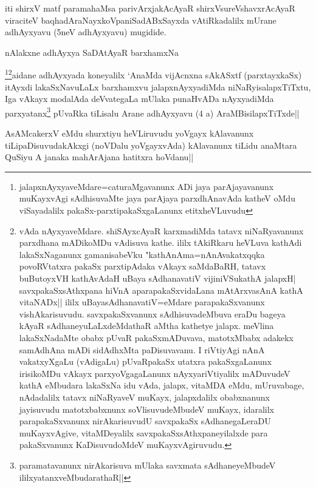 \begin{center}
iti shirxV matf paramahaMsa parivArxjakAcAyaR shirxVsureVshavxrAcAyaR viraciteV baqhadAraNayxkoVpaniSadABxSayxda vAtiRkadalilx mUrane adhAyxyavu (5neV adhAyxyavu) mugidide.
\end{center}
\stext 

\begin{center}%
nAlakxne adhAyxya SaDAtAyaR barxhamxNa
\end{center}

\begin{artha}
\footnote[1]{jalapxnAyxyaveMdare=caturaMgavanunx ADi jaya parAjayavanunx muKayxvAgi sAdhisuvaMte jaya parAjaya parxdhAnavAda katheV oMdu viSayadalilx pakaSx-parxtipakaSxgaLanunx etitxheVLuvudu}\footnote[2]{vAda nAyxyaveMdare. shiSAyxcAyaR karxmadiMda tatavx niNaRyavanunx parxdhana mADikoMDu vAdisuva kathe. ililx tAkiRkaru heVLuva kathAdi lakaSxNaganunx gamanisabeVku "kathAnAma=nAnAvakatxqqka povoRVtatxra pakaSx parxtipAdaka vAkayx saMdaBaRH, tatavx buButoyxVH kathAvAdaH uBaya sAdhanavatiV vijiniVSukathA jalapxH| savxpakaSxsAthxpana hiVnA aparapakaSxvidaLana mAtArxvasAnA kathA vitaNADx|| ililx uBayasAdhanavatiV=eMdare parapakaSxvanunx vishAkarisuvudu. savxpakaSxvanunx sAdhisuvadeMbuva eraDu bageya kAyaR sAdhaneyuLaLxdeMdathaR aMtha kathetye jalapx. meVlina lakaSxNadaMte obabx pUvaR pakaSxmADuvava, matotxMbabx adakekx samAdhAna mADi sidAdhxMta paDisuvavanu. I riVtiyAgi nAnA vakatxyXgaLu (vAdigaLu) pUvaRpakaSx utatxra pakaSxgaLanunx irisikoMDu vAkayx parxyoVgagaLanunx nAyxyariVtiyalilx mADuvudeV kathA eMbudara lakaSxNa idu vAda, jalapx, vitaMDA eMdu, mUruvabage, nAdadalilx tatavx niNaRyaveV muKayx, jalapxdalilx obabxnanunx jayisuvudu matotxbabxnunx soVlisuvudeMbudeV muKayx, idaralilx parapakaSxvanunx nirAkarisuvudU savxpakaSx sAdhanegaLeraDU muKayxvAgive, vitaMDeyalilx savxpakaSxsAthxpaneyilalxde para pakaSxvanunx KaDisuvudoMdeV muKayxvAgiruvudu.}aidane adhAyxyada koneyalilx `AnaMda vijAcnxna sAkASxtf (parxtayxkaSx) itAyxdi lakaSxNavuLaLx barxhamxvu jalapxnAyxyadiMda niNaRyisalapxTiTxtu, Iga vAkayx modalAda deVvategaLa mUlaka punaHvADa nAyxyadiMda parxyatanx\footnote[3]{paramatavanunx nirAkarisuva mUlaka savxmata sAdhaneyeMbudeV ililxyatanxveMbudarathaR||} pUvaRka tiLisalu Arane adhAyxyavu (4 a) AraMBisilapxTiTxde||
\end{artha}

\begin{artha}
AsAMcakerxV eMdu shurxtiyu heVLiruvudu yoVgayx kAlavanunx tiLipaDisuvudakAkxgi (noVDalu yoVgayxvAda) kAlavanunx tiLidu anaMtara QuSiyu A janaka mahArAjana hatitxra hoVdanu||
\end{artha}

